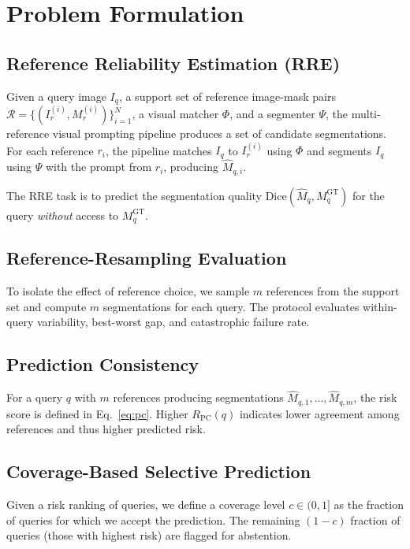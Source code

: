 \documentclass[11pt]{article}
\newcommand{\RRE}{RRE}
\newcommand{\RPC}{R_{\text{PC}}}
\begin{document}
\section{Problem Formulation}

\subsection{Reference Reliability Estimation (\RRE{})}
Given a query image $I_q$, a support set of reference image-mask pairs 
$\mathcal{R} = \{(I_r^{(i)}, M_r^{(i)})\}_{i=1}^{N}$, a visual matcher $\Phi$, and a 
segmenter $\Psi$, the multi-reference visual prompting pipeline produces a set of candidate 
segmentations. For each reference $r_i$, the pipeline matches $I_q$ to $I_r^{(i)}$ using 
$\Phi$ and segments $I_q$ using $\Psi$ with the prompt from $r_i$, producing $\hat{M}_{q,i}$.

The \RRE{} task is to predict the segmentation quality $\text{Dice}(\hat{M}_q, M_q^{\text{GT}})$ 
for the query \textit{without} access to $M_q^{\text{GT}}$.

\subsection{Reference-Resampling Evaluation}
To isolate the effect of reference choice, we sample $m$ references from the support set 
and compute $m$ segmentations for each query. The protocol evaluates within-query variability, 
best-worst gap, and catastrophic failure rate.

\subsection{Prediction Consistency}
For a query $q$ with $m$ references producing segmentations $\hat{M}_{q,1}, \ldots, \hat{M}_{q,m}$, 
the risk score is defined in Eq.~\ref{eq:pc}. Higher $\RPC(q)$ indicates lower agreement 
among references and thus higher predicted risk.

\subsection{Coverage-Based Selective Prediction}
Given a risk ranking of queries, we define a coverage level $c \in (0, 1]$ as the fraction 
of queries for which we accept the prediction. The remaining $(1-c)$ fraction of queries 
(those with highest risk) are flagged for abstention.
\end{document}
